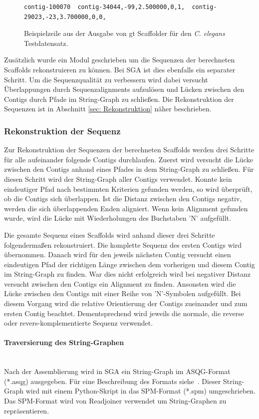 \documentclass[a4paper,11pt,parskip]{scrartcl}
\begin{document}
\begin{figure}
\begin{verbatim}
contig-100070  contig-34044,-99,2.500000,0,1,  contig-29023,-23,3.700000,0,0,
\end{verbatim}
\caption{\label{abb: scaf}Beispielzeile aus der Ausgabe von gt
  Scaffolder für den \textit{C. elegans} Testdatensatz.}
\end{figure}

Zusätzlich wurde ein Modul geschrieben um die Sequenzen der
berechneten Scaffolds rekonstruieren zu können. Bei SGA ist dies
ebenfalls ein separater Schritt. Um die Sequenzqualität zu verbessern
wird dabei versucht Überlappungen durch Sequenzalignments aufzulösen
und Lücken zwischen den Contigs durch Pfade im String-Graph zu
schließen. Die Rekonstruktion der Sequenzen ist in Abschnitt \ref{sec:
  Rekonstruktion} näher beschrieben.

\subsubsection{Rekonstruktion der Sequenz}
\label{sec: Rekonstruktion}
Zur Rekonstruktion der Sequenzen der berechneten Scaffolds werden drei
Schritte für alle aufeinander folgende Contigs durchlaufen. Zuerst
wird versucht die Lücke zwischen den Contigs anhand eines Pfades
in dem String-Graph zu schließen. Für diesen Schritt wird der
String-Graph aller Contigs verwendet. Konnte kein eindeutiger Pfad nach
bestimmten Kriterien gefunden werden, so wird überprüft, ob die
Contigs sich überlappen. Ist die Distanz zwischen den Contigs negativ,
werden die sich überlappenden Enden aligniert. Wenn kein Alignment
gefunden wurde, wird die Lücke mit Wiederholungen des Buchstaben 'N'
aufgefüllt.

Die gesamte Sequenz eines Scaffolds wird anhand dieser drei Schritte
folgendermaßen rekonstruiert. Die komplette Sequenz des ersten Contigs
wird übernommen. Danach wird für den jeweils nächsten Contig versucht
einen eindeutigen Pfad der richtigen Länge zwischen dem vorherigen und
diesem Contig im String-Graph zu finden. War dies nicht erfolgreich
wird bei negativer Distanz versucht zwischen den Contigs ein Alignment
zu finden. Ansonsten wird die Lücke zwischen den Contigs mit einer Reihe
von 'N'-Symbolen aufgefüllt. Bei diesem Vorgang wird die relative
Orientierung der Contigs zueinander und zum ersten Contig
beachtet. Dementsprechend wird jeweils die normale, die reverse oder
revers-komplementierte Sequenz verwendet.

\paragraph{Traversierung des String-Graphen}~\\
Nach der Assemblierung wird in SGA ein String-Graph im ASQG-Format
(*.asqg) ausgegeben. Für eine Beschreibung des Formats
siehe~\cite{asqg}. Dieser String-Graph wird mit einem Python-Skript in
das SPM-Format (*.spm) umgeschrieben. Das SPM-Format wird von
Readjoiner verwendet um String-Graphen zu repräsentieren.
\end{document}
